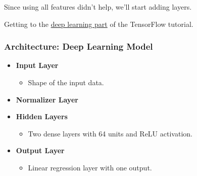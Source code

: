 \documentclass[11pt]{article}
\providecommand{\tightlist}{%
      \setlength{\itemsep}{0pt}\setlength{\parskip}{0pt}}
\begin{document}
Since using all features didn't help, we'll start adding layers.

Getting to the
\href{https://www.tensorflow.org/tutorials/keras/regression\#regression_with_a_deep_neural_network_dnn}{deep
learning part} of the TensorFlow tutorial.

\subsubsection{Architecture: Deep Learning
Model}\label{architecture-deep-learning-model}

\begin{itemize}
\tightlist
\item
  \textbf{Input Layer}

  \begin{itemize}
  \tightlist
  \item
    Shape of the input data.
  \end{itemize}
\item
  \textbf{Normalizer Layer}
\item
  \textbf{Hidden Layers}

  \begin{itemize}
  \tightlist
  \item
    Two dense layers with 64 units and ReLU activation.
  \end{itemize}
\item
  \textbf{Output Layer}

  \begin{itemize}
  \tightlist
  \item
    Linear regression layer with one output.
  \end{itemize}
\end{itemize}
\end{document}
